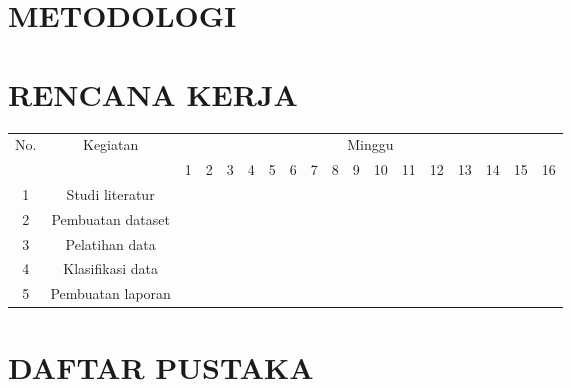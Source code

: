\documentclass[a4paper]{article}
\begin{document}
\section{METODOLOGI}
\section{RENCANA KERJA}
\begin{table}
	\begin{tabular}{|c|c|c|c|c|c|c|c|c|c|c|c|c|c|c|c|c|c|}
		\hline
		\multirow{2}{*}{No.} & \multirow{2}{*}{Kegiatan} & \multicolumn{16}{|c|}{Minggu} \\
		\cline{3-18} &&1&2&3&4&5&6&7&8&9&10&11&12&13&14&15&16 \\
		\hline
		1 & Studi literatur &&&&&&&&&&&&&&&& \\
		\hline
		2 & Pembuatan dataset &&&&&&&&&&&&&&&& \\
		\hline
		3 & Pelatihan data &&&&&&&&&&&&&&&& \\
		\hline
		4 & Klasifikasi data &&&&&&&&&&&&&&&& \\
		\hline
		5 & Pembuatan laporan &&&&&&&&&&&&&&&& \\
		\hline
	\end{tabular}
\end{table}
\section{DAFTAR PUSTAKA}
\end{document}
